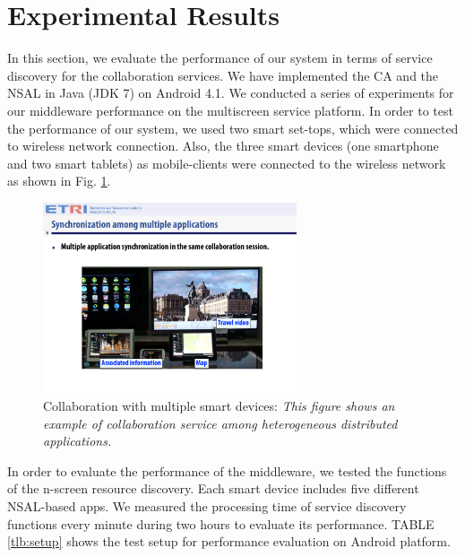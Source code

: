 \documentclass[conference]{IEEEtran}
\begin{document}
\section{Experimental Results}
\label{sc:Experiments}
In this section, we evaluate the performance of our system in terms of service discovery for the collaboration services. 
We have implemented the CA and the NSAL in Java (JDK 7) on Android 4.1. 
We conducted a series of experiments for our middleware performance  on the multiscreen service platform. 
In order to test the performance of our system, we used two smart set-tops, 
which were connected to wireless network connection. Also, the three smart devices (one smartphone and two smart tablets) as mobile-clients 
were connected to the wireless network as shown in Fig. \ref{fig:multiplecollaboration}. 
    \begin{figure}[htb] %
    \centering
    \includegraphics[width=7.5cm,keepaspectratio]{multiplecollaboration_2}
    \caption{Collaboration with multiple smart devices: \emph{This figure shows an example of collaboration service among heterogeneous distributed applications.}}
    \label{fig:multiplecollaboration}
    \end{figure}

In order to evaluate the performance of the middleware, we tested the functions of the n-screen resource discovery. Each
smart device includes five different NSAL-based apps. We measured the processing time of service discovery functions every minute during two hours to evaluate its performance. TABLE \ref{tlb:setup} shows the test setup for performance evaluation on Android platform.

    \begin{table}[htb]
    \caption{Test Setup for Performance Evaluation}
    \label{tlb:setup}
    \end{table}
\end{document}
